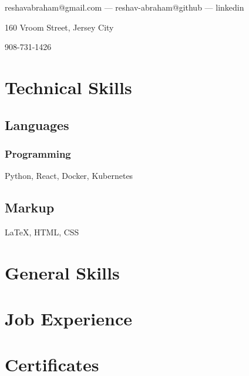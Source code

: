 \documentclass{article}
\makeatletter
\renewcommand{\maketitle}{
\begin{center}
{\huge\bfseries
\theauthor}

\vspace{0.3em}

reshavabraham@gmail.com --- reshav-abraham@github --- linkedin

160 Vroom Street, Jersey City

908-731-1426
	
\end{center}
}
\makeatother
\begin{document}
\author{Reshav Abraham}
\date{March 29 2021}
\maketitle
\section{Technical Skills}

\subsection{Languages}

\subsubsection{Programming}
Python, React, Docker, Kubernetes

\subsection{Markup}
{\LaTeX}, HTML, CSS
\section{General Skills}
\section{Job Experience}
\section{Certificates}
\end{document}
